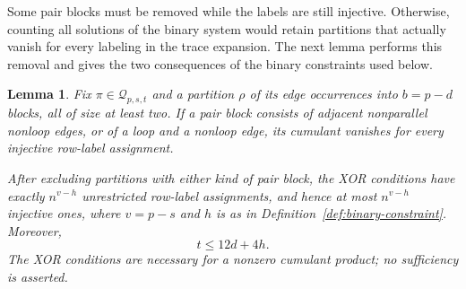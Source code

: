 \documentclass[11pt]{article}
\newtheorem{lemma}[theorem]{Lemma}
\theoremstyle{definition}
\theoremstyle{remark}
\theoremstyle{plain}
\begin{document}
Some pair blocks must be removed while the labels are still
injective. Otherwise, counting all solutions of the binary system
would retain partitions that actually vanish for every labeling in
the trace expansion. The next lemma performs this removal and gives
the two consequences of the binary constraints used below.

\begin{lemma}\label{lem:binary-constraints}
Fix $\pi\in\mathcal Q_{p,s,t}$ and a partition $\rho$ of its edge
occurrences into $b=p-d$ blocks, all of size at least two. If a pair
block consists of adjacent nonparallel nonloop edges, or of a loop
and a nonloop edge, its cumulant vanishes for every injective
row-label assignment.

After excluding partitions with either kind of pair block, the XOR
conditions have exactly $n^{v-h}$ unrestricted row-label assignments,
and hence at most $n^{v-h}$ injective ones, where $v=p-s$ and $h$ is
as in Definition~\ref{def:binary-constraint}. Moreover,
\begin{equation}\label{eq:odd-incidence}
                              t\le12d+4h.
\end{equation}
The XOR conditions are necessary for a nonzero cumulant product;
no sufficiency is asserted.
\end{lemma}
\end{document}
